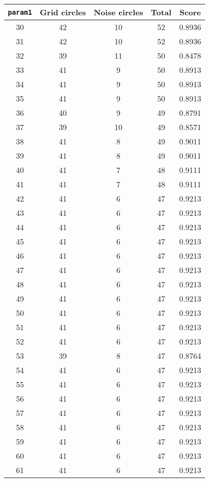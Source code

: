 \documentclass[letterpaper, 12pt]{article}
\begin{document}
\begin{longtable}{|c|c|c|c|c|}
\hline
\textbf{\texttt{param1}} & \textbf{Grid circles} & \textbf{Noise circles} & \textbf{Total} & \textbf{Score} \\
\hline
30 & 42 & 10 & 52 & 0.8936 \\
\hline
31 & 42 & 10 & 52 & 0.8936 \\
\hline
32 & 39 & 11 & 50 & 0.8478 \\
\hline
33 & 41 & 9 & 50 & 0.8913 \\
\hline
34 & 41 & 9 & 50 & 0.8913 \\
\hline
35 & 41 & 9 & 50 & 0.8913 \\
\hline
36 & 40 & 9 & 49 & 0.8791 \\
\hline
37 & 39 & 10 & 49 & 0.8571 \\
\hline
38 & 41 & 8 & 49 & 0.9011 \\
\hline
39 & 41 & 8 & 49 & 0.9011 \\
\hline
40 & 41 & 7 & 48 & 0.9111 \\
\hline
41 & 41 & 7 & 48 & 0.9111 \\
\hline
42 & 41 & 6 & 47 & 0.9213 \\
\hline
43 & 41 & 6 & 47 & 0.9213 \\
\hline
44 & 41 & 6 & 47 & 0.9213 \\
\hline
45 & 41 & 6 & 47 & 0.9213 \\
\hline
46 & 41 & 6 & 47 & 0.9213 \\
\hline
47 & 41 & 6 & 47 & 0.9213 \\
\hline
48 & 41 & 6 & 47 & 0.9213 \\
\hline
49 & 41 & 6 & 47 & 0.9213 \\
\hline
50 & 41 & 6 & 47 & 0.9213 \\
\hline
51 & 41 & 6 & 47 & 0.9213 \\
\hline
52 & 41 & 6 & 47 & 0.9213 \\
\hline
53 & 39 & 8 & 47 & 0.8764 \\
\hline
54 & 41 & 6 & 47 & 0.9213 \\
\hline
55 & 41 & 6 & 47 & 0.9213 \\
\hline
56 & 41 & 6 & 47 & 0.9213 \\
\hline
57 & 41 & 6 & 47 & 0.9213 \\
\hline
58 & 41 & 6 & 47 & 0.9213 \\
\hline
59 & 41 & 6 & 47 & 0.9213 \\
\hline
60 & 41 & 6 & 47 & 0.9213 \\
\hline
61 & 41 & 6 & 47 & 0.9213 \\

\end{longtable}
\end{document}
